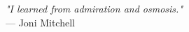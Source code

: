 
\begin{flushright}
    \emph{"I learned from admiration and osmosis."}\\
    — Joni Mitchell
\end{flushright}